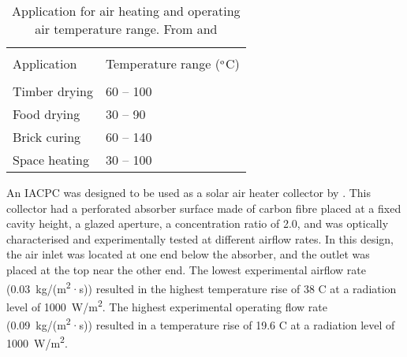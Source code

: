 \begin{table}[!ht]
	\caption{Application for air heating and operating air temperature range. From \citet{Norton2012} and \citet{Pranesh2019}}
	\centering
	\begin{tabular}{p{4cm}p{4cm}}
		\hline \\[-10pt]
		Application & Temperature range ($^{\rm{o}}$C) \\
		\hline \\[-10pt]
		Timber drying & 60 -- 100 \\ [3pt]
		Food drying & 30 -- 90 \\ [3pt]
		Brick curing & 60 -- 140 \\ [3pt]
		Space heating & 30 -- 100 \\ [3pt]
		\hline
	\end{tabular}
\label{air-application}
\end{table}

An IACPC was designed to be used as a solar air heater collector by \citet{Shams2013}. This collector had a perforated absorber surface made of carbon fibre placed at a fixed cavity height, a glazed aperture, a concentration ratio of 2.0, and was optically characterised and experimentally tested at different airflow rates. In this design, the air inlet was located at one end below the absorber, and the outlet was placed at the top near the other end. The lowest experimental airflow rate (0.03~kg/(m\textsuperscript{2}·s)) resulted in the highest temperature rise of 38 \textdegree C at a radiation level of 1000~W/m\textsuperscript{2}. The highest experimental operating flow rate (0.09~kg/(m\textsuperscript{2}·s)) resulted in a temperature rise of 19.6 \textdegree C at a radiation level of 1000~W/m\textsuperscript{2}.


